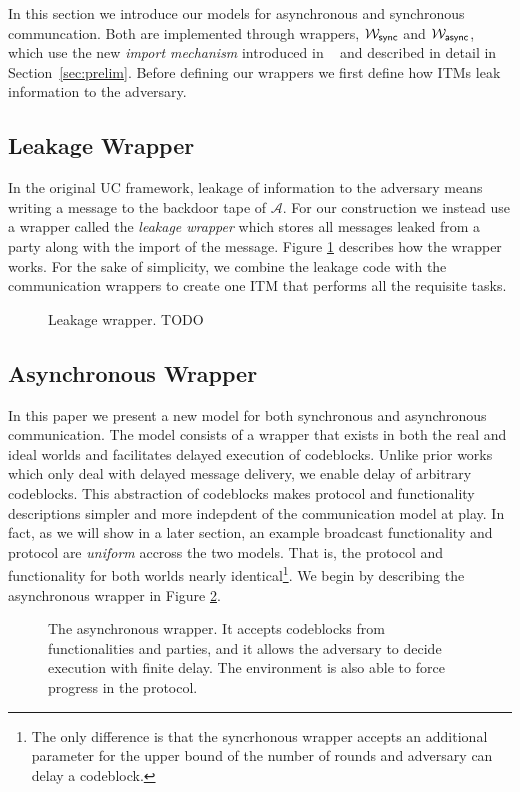 In this section we introduce our models for asynchronous and synchronous communcation.
Both are implemented through wrappers, $\mathcal{W}_{{\mathsf {sync}}}$ and $\mathcal{W}_{{\mathsf {async}}}$, which use the new {\em import mechanism} introduced in ~\cite{uc} and described in detail in Section~\ref{sec:prelim}.
Before defining our wrappers we first define how ITMs leak information to the adversary.


\subsection{Leakage Wrapper}
In the original UC framework, leakage of information to the adversary means writing a message to the backdoor tape of $\mathcal{A}$.
For our construction we instead use a wrapper called the {\em leakage wrapper} which stores all messages leaked from a party along with the import of the message.
Figure \ref{fig:wrapper:leak} describes how the wrapper works.
For the sake of simplicity, we combine the leakage code with the communication wrappers to create one ITM that performs all the requisite tasks.

\begin{figure}[h]
	
	\caption{Leakage wrapper. TODO}
	\label{fig:wrapper:leak}
\end{figure}

\subsection{Asynchronous Wrapper}
In this paper we present a new model for both synchronous and asynchronous communication.
The model consists of a wrapper that exists in both the real and ideal worlds and facilitates delayed execution of codeblocks.
Unlike prior works which only deal with delayed message delivery, we enable delay of arbitrary codeblocks.
This abstraction of codeblocks makes protocol and functionality descriptions simpler and more indepdent of the communication model at play.
In fact, as we will show in a later section, an example broadcast functionality and protocol are {\em uniform} accross the two models.
That is, the protocol and functionality for both worlds nearly identical\footnote{The only difference is that the syncrhonous wrapper accepts an additional parameter for the upper bound of the number of rounds and adversary can delay a codeblock.}.
We begin by describing the asynchronous wrapper in Figure \ref{fig:wrapper:async}.

\begin{figure}
\centering
	
	\caption{The asynchronous wrapper. It accepts codeblocks from functionalities and parties, and it allows the adversary to decide execution with finite delay. The environment is also able to force progress in the protocol.}
	\label{fig:wrapper:async}
\end{figure}

